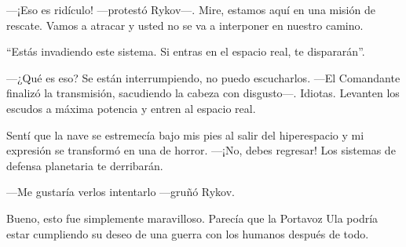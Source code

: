 —¡Eso es ridículo! —protestó Rykov—. Mire, estamos aquí en una misión de rescate. Vamos a atracar y usted no se va a interponer en nuestro camino.

``Estás invadiendo este sistema. Si entras en el espacio real, te dispararán''.

—¿Qué es eso? Se están interrumpiendo, no puedo escucharlos. —El Comandante finalizó la transmisión, sacudiendo la cabeza con disgusto—. Idiotas. Levanten los escudos a máxima potencia y entren al espacio real.

Sentí que la nave se estremecía bajo mis pies al salir del hiperespacio y mi expresión se transformó en una de horror. —¡No, debes regresar! Los sistemas de defensa planetaria te derribarán.

—Me gustaría verlos intentarlo —gruñó Rykov.

Bueno, esto fue simplemente maravilloso. Parecía que la Portavoz Ula podría estar cumpliendo su deseo de una guerra con los humanos después de todo.
